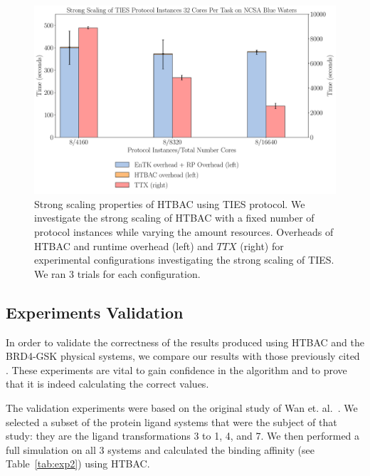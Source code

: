 \begin{figure}
  \centering
   \includegraphics[width=\columnwidth]{figures/new_ss_ties.pdf}
    \caption{Strong scaling properties of HTBAC using TIES protocol. We
    investigate the strong scaling of HTBAC with a fixed number of protocol
    instances while varying the amount resources. Overheads of HTBAC and
    runtime overhead (left) and \(TTX\) (right) for experimental
    configurations investigating the strong scaling of TIES. We ran 3 trials
    for each configuration.}
\label{fig:strong_scaling_TIES}
\end{figure}



\subsection{Experiments Validation}


In order to validate the correctness of the results produced using HTBAC and
the BRD4-GSK physical systems, we compare our results with those previously
cited . These experiments  are vital to gain confidence in
the algorithm  and to prove that it is indeed
calculating the correct values.

The validation experiments were based on the original study of Wan et.
al.~\cite{Wan2017brd4}. We selected a subset of the protein ligand systems
that were the subject of that study: they are the ligand transformations 3 to
1, 4, and 7. We then performed a full simulation on all 3 systems and
calculated the binding affinity (see Table~\ref{tab:exp2}) using HTBAC.

